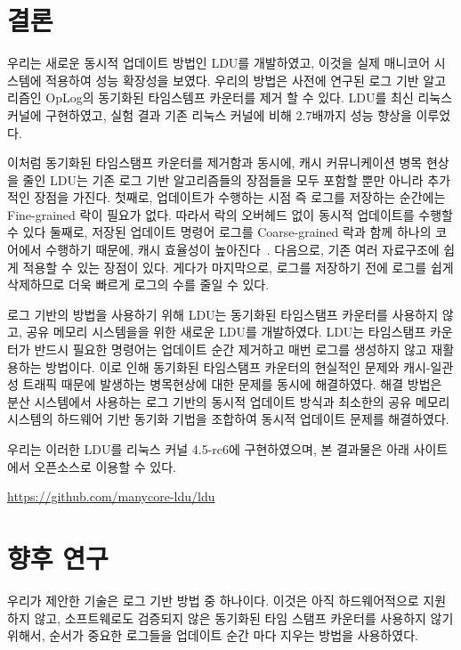 
\section{결론}

우리는 새로운 동시적 업데이트 방법인 LDU를 개발하였고, 
이것을 실제 매니코어 시스템에 적용하여 성능 확장성을 보였다.
우리의 방법은 사전에 연구된 로그 기반 알고리즘인 OpLog의 동기화된 타임스템프 카운터를 제거 할 수 있다. 
LDU를 최신 리눅스 커널에 구현하였고, 실험 결과 기존 리눅스 커널에 비해 2.7배까지 성능 향상을 이루었다. 

이처럼 동기화된 타임스탬프 카운터를 제거함과 동시에, 캐시 커뮤니케이션 병목 현상을 줄인
LDU는 기존 로그 기반 알고리즘들의 장점들을 모두 포함할 뿐만 아니라 추가적인 장점을 가진다.
첫째로, 업데이트가 수행하는 시점 즉 로그를 저장하는 순간에는 Fine-grained 락이 필요가 없다.
따라서 락의 오버헤드 없이 동시적 업데이트를 수행할 수 있다
둘째로, 저장된 업데이트 명령어 로그를 Coarse-grained 락과 함께 하나의 코어에서 수행하기 때문에, 
캐시 효율성이 높아진다~\cite{Hendler2010FC}.
다음으로, 기존 여러 자료구조에 쉽게 적용할 수 있는 장점이 있다.
게다가 마지막으로, 로그를 저장하기 전에 로그를 쉽게 삭제하므로 더욱 빠르게 로그의 수를 줄일 수 있다. 

로그 기반의 방법을 사용하기 위해 LDU는 동기화된 타임스탬프 카운터를 사용하지 않고,
공유 메모리 시스템을을 위한 새로운 LDU를 개발하였다.
LDU는 타임스탬프 카운터가 반드시 필요한 명령어는 업데이트 순간 제거하고 매번 로그를 
생성하지 않고 재활용하는 방법이다.
이로 인해 동기화된 타임스탬프 카운터의 현실적인 문제와 캐시-일관성 트래픽 때문에 발생하는 
병목현상에 대한 문제를 동시에 해결하였다.
해결 방법은 분산 시스템에서 사용하는 로그 기반의 
동시적 업데이트 방식과 최소한의 공유 메모리 시스템의 하드웨어 기반 동기화 기법을 조합하여 동시적 
업데이트 문제를 해결하였다.

우리는 이러한 LDU를 리눅스 커널 4.5-rc6에 구현하였으며, 본 결과물은
아래 사이트에서 오픈소스로 이용할 수 있다.
\begin{center}
\url{https://github.com/manycore-ldu/ldu}
\end{center}

\newpage
\section{향후 연구}

우리가 제안한 기술은 로그 기반 방법 중 하나이다. 
이것은 아직 하드웨어적으로 지원하지 않고, 소프트웨로도 검증되지 않은 
동기화된 타임 스탬프 카운터를 사용하지 않기 위해서, 
순서가 중요한 로그들을 업데이트 순간 마다 지우는 방법을 사용하였다. 

